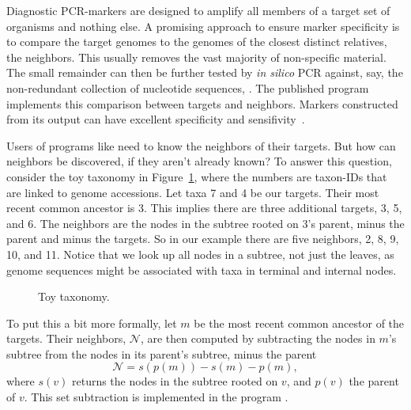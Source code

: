 Diagnostic PCR-markers are designed to amplify all members of a target
set of organisms and nothing else. A promising approach to ensure
marker specificity is to compare the target genomes to the genomes of
the closest distinct relatives, the neighbors. This usually removes
the vast majority of non-specific material. The small remainder can
then be further tested by \emph{in silico} PCR against, say, the
non-redundant collection of nucleotide sequences, . The
published program  implements this comparison between targets
and neighbors. Markers constructed from its output can have excellent
specificity and sensifivity~\cite{hau21:fur}.

Users of programs like  need to know the neighbors of their
targets. But how can neighbors be discovered, if they aren't already
known? To answer this question, consider the toy taxonomy in
Figure~\ref{fig:tax}, where the numbers are taxon-IDs that are linked
to genome accessions. Let taxa 7 and 4 be our targets. Their most
recent common ancestor is 3. This implies there are three additional
targets, 3, 5, and 6. The neighbors are the nodes in the subtree
rooted on 3's parent, minus the parent and minus the targets. So in
our example there are five neighbors, 2, 8, 9, 10, and 11. Notice that
we look up all nodes in a subtree, not just the leaves, as genome
sequences might be associated with taxa in terminal and internal
nodes.

\begin{figure}
\begin{center}

\end{center}
\caption{Toy taxonomy.}\label{fig:tax}
\end{figure}

To put this a bit more formally, let $m$ be the most recent common
ancestor of the targets. Their neighbors, $\mathcal{N}$, are then
computed by subtracting the nodes in $m$'s subtree from the nodes in
its parent's subtree, minus the parent
\begin{equation}\label{eq:nei}
\mathcal{N} = s(p(m)) - s(m) - p(m),
\end{equation}
where $s(v)$ returns the nodes in the subtree rooted on $v$, and
$p(v)$ the parent of $v$. This set subtraction is implemented in the
program .

